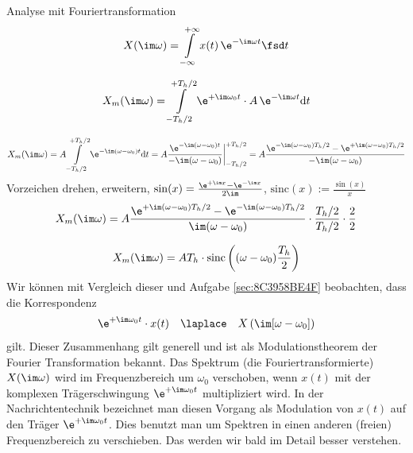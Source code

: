 \begin{Werkzeug}
Analyse mit Fouriertransformation
\begin{align}
X(\im \omega) = \int\limits_{-\infty}^{+\infty} x(t) \, \e^{-\im \omega t} \fsd t
\end{align}
\end{Werkzeug}
\begin{Ansatz}
\begin{align}
X_m(\im \omega) = \int\limits_{-T_h/2}^{+T_h/2} \e^{+\im \omega_0 t} \cdot A \, \e^{-\im \omega t} \mathrm{d}t
\end{align}
\end{Ansatz}
\begin{ExCalc}
\begin{align}
X_m(\im \omega) = A \int\limits_{-T_h/2}^{+T_h/2} \e^{-\im (\omega-\omega_0) t} \mathrm{d}t =
A \frac{\e^{-\im (\omega-\omega_0) t}}{-\im (\omega-\omega_0)}\bigg|_{-T_h/2}^{+T_h/2} =
A \frac{\e^{-\im (\omega-\omega_0) T_h/2} - \e^{+\im (\omega-\omega_0) T_h/2}}{-\im (\omega-\omega_0)}
\end{align}
Vorzeichen drehen, erweitern, $\sin(x) = \frac{\e^{+\im x}-\e^{-\im x}}{2\im}$, $\mathrm{sinc}(x):=\frac{\sin (x)}{x}$
\begin{align}
X_m(\im \omega) = A \frac{\e^{+\im (\omega-\omega_0) T_h/2} - \e^{-\im (\omega-\omega_0) T_h/2}}{\im (\omega-\omega_0)} \cdot \frac{T_h/2}{T_h/2} \cdot \frac{2}{2}
\end{align}
\end{ExCalc}
\begin{Loesung}
\begin{align}
X_m(\im \omega) = A T_h \cdot \mathrm{sinc}\left((\omega-\omega_0) \frac{T_h}{2}\right)
\end{align}
Wir können mit Vergleich dieser und  Aufgabe \ref{sec:8C3958BE4F} beobachten, dass
die Korrespondenz
\begin{align}
\e^{+\im \omega_0 t} \cdot x(t) \quad\laplace\quad X\left(\im [\omega-\omega_0]\right)
\end{align}
gilt.
%
Dieser Zusammenhang gilt generell und ist als Modulationstheorem der
Fourier Transformation bekannt.
%
Das Spektrum (die Fouriertransformierte) $X(\im \omega)$ wird im Frequenzbereich
um $\omega_0$ verschoben, wenn $x(t)$ mit der komplexen Trägerschwingung
$\e^{+\im \omega_0 t}$ multipliziert wird. In der Nachrichtentechnik bezeichnet man
diesen Vorgang als Modulation von $x(t)$ auf den Träger $\e^{+\im \omega_0 t}$.
Dies benutzt man um Spektren in einen anderen (freien) Frequenzbereich zu
verschieben. Das werden wir bald im Detail besser verstehen.
\end{Loesung}


